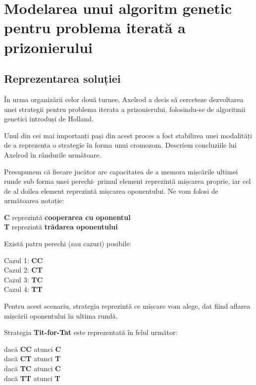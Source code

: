 \section{Modelarea unui algoritm genetic pentru problema iterată a prizonierului}

\subsection{Reprezentarea soluției}

În urma organizării celor două turnee, Axelrod a decis să cerceteze dezvoltarea unei strategii pentru problema iterata a prizonierului, folosindu-se de algoritmii genetici introduși de Holland. 

Unul din cei mai importanți pași din acest proces a fost stabilirea unei modalități de a reprezenta o strategie în forma unui cromozom. Descriem concluziile lui Axelrod în rândurile următoare.

Presupunem că fiecare jucător are capacitatea de a memora mișcările ultimei runde sub forma unei perechi- primul element reprezintă mișcarea proprie, iar cel de al doilea element reprezintă mișcarea oponentului. Ne vom folosi de următoarea notație:

\begin{center}
	\textbf{C} reprezintă \textbf{cooperarea cu oponentul}\\
	\textbf{T} reprezintă \textbf{trădarea oponentului}   
\end{center}

Există patru perechi (sau cazuri) posibile:\\

\begin{center}
	Cazul 1: \textbf{CC}\\
	Cazul 2: \textbf{CT}\\
	Cazul 3: \textbf{TC}\\
	Cazul 4: \textbf{TT}\\
\end{center}

Pentru acest scenariu, strategia reprezintă ce mișcare vom alege, dat fiind aflarea mișcării oponentului în ultima rundă.

Strategia \textbf{Tit-for-Tat} este reprezentată în felul următor: 

\begin{center}
	dacă \textbf{CC} atunci \textbf{C}\\
	dacă \textbf{CT} atunci \textbf{T}\\
	dacă \textbf{TC} atunci \textbf{C}\\
	dacă \textbf{TT} atunci \textbf{T}\\
\end{center}

